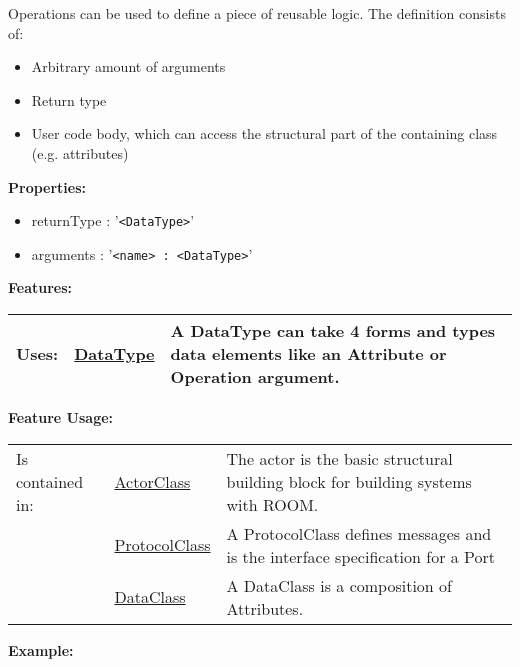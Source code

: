 	Operations can be used to define a piece of reusable logic. The definition consists of:
	\begin{itemize}
		\item Arbitrary amount of arguments
		\item Return type
		\item User code body, which can access the structural part of the containing class (e.g. attributes)
	\end{itemize}
		
	\textbf{Properties:}
	\begin{itemize}
	\item returnType : '\verb|<DataType>|'
	\item arguments : '\verb|<name> : <DataType>|'
	\end{itemize}
		
	\begingroup
	\textbf{Features:}
	\renewcommand{\arraystretch}{1.8} %
	\begin{longtable}{l|l p{}}
		\hline
	Uses: & \tabitem \hyperlink{ref:DataType}{DataType}  & A DataType can take 4 forms and types data elements like an Attribute or Operation argument.\\
	\hline
	\end{longtable}
	\endgroup
		
	\begingroup
	\textbf{Feature Usage:}
	\renewcommand{\arraystretch}{1.8} %
	\begin{longtable}{l|l p{}}
		\hline
	Is contained in: & \tabitem \hyperlink{ref:ActorClass}{ActorClass}  & The actor is the basic structural building block for building systems with ROOM.\\
	& \tabitem \hyperlink{ref:ProtocolClass}{ProtocolClass}  & A ProtocolClass defines messages and is the interface specification for a Port \\
	& \tabitem \hyperlink{ref:DataClass}{DataClass}  & A DataClass is a composition of Attributes. \\
	\hline
	\end{longtable}
	\endgroup
		
	\textbf{Example:}
	
